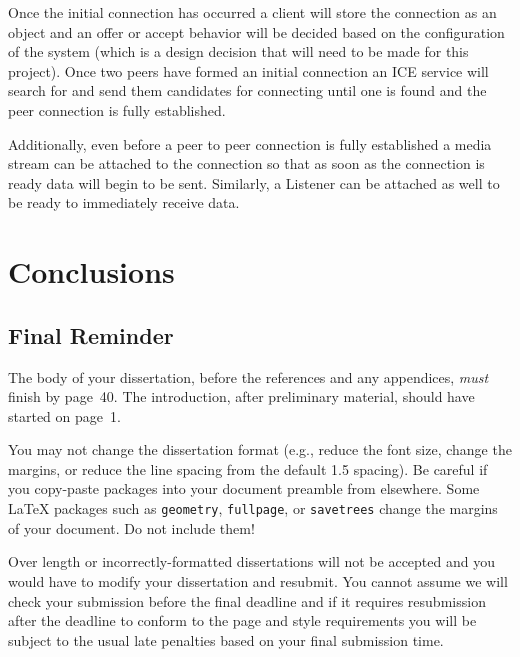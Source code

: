 \documentclass[bsc,frontabs,singlespacing,parskip,deptreport]{infthesis}
\begin{document}
Once the initial connection has occurred a client will store the connection as an object and an offer or accept behavior will be decided based on the configuration of the system (which is a design decision that will need to be made for this project).  Once two peers have formed an initial connection an ICE service will search for and send them candidates for connecting until one is found and the peer connection is fully established.

Additionally, even before a peer to peer connection is fully established a media stream can be attached to the connection so that as soon as the connection is ready data will begin to be sent.  Similarly, a Listener can be attached as well to be ready to immediately receive data.

\chapter{Conclusions}

\section{Final Reminder}

The body of your dissertation, before the references and any appendices,
\emph{must} finish by page~40. The introduction, after preliminary material,
should have started on page~1.

You may not change the dissertation format (e.g., reduce the font size, change
the margins, or reduce the line spacing from the default 1.5 spacing). Be
careful if you copy-paste packages into your document preamble from elsewhere.
Some \LaTeX{} packages such as \texttt{geometry}, \texttt{fullpage}, or
\texttt{savetrees} change the margins of your document. Do not include them!

Over length or incorrectly-formatted dissertations will not be accepted and you
would have to modify your dissertation and resubmit. You cannot assume we will
check your submission before the final deadline and if it requires resubmission
after the deadline to conform to the page and style requirements you will be
subject to the usual late penalties based on your final submission time.




%
%
%
\end{document}
